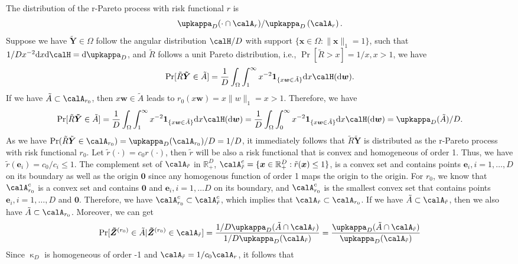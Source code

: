 \documentclass[12pt]{article}
\begin{document}
    The distribution of the r-Pareto process with risk functional $r$ is 
    $$\upkappa_D(\cdot\cap \calA_r )/\upkappa_D\left(\calA_r\right).$$ 
    Suppose we have $\bm{\tilde Y}\in\Omega$ follow the angular distribution $\calH/D$ with support $\{\bm x \in \Omega: \|\bm x\|_1 = 1\}$, such that $1/D x^{-2}\text dx\text d\calH = \text d\upkappa_D$,  and $\tilde R$ follows a unit Pareto distribution, i.e., $\Pr[\tilde R>x]=1/x, x>1$, we have
    $$\Pr[\tilde R\bm{\tilde Y}\in \tilde A] = \frac{1}{D}\int_{\Omega}\int_{1}^{\infty} x^{-2}\bm 1_{\{x\bm w\in \tilde A\}}\text dx\calH(\text d\bm w).$$
    If we have $\tilde A\subset\calA_{r_0}$, then $x\bm w\in\tilde A$ leads to $r_0(x\bm w)=x\|w\|_1=x >1$. Therefore, we have 
    $$\Pr[\tilde R\bm{\tilde Y}\in \tilde A] = \frac{1}{D}\int_{\Omega}\int_{1}^{\infty} x^{-2}\bm 1_{\{x\bm w\in \tilde A\}}\text dx\calH(\text d\bm w) = \frac{1}{D}\int_{\Omega}\int_{0}^{\infty} x^{-2}\bm 1_{\{x\bm w\in \tilde A\}}\text dx\calH(\text d\bm w) = \upkappa_D(\tilde A)/D.$$ 
    As we have $\Pr( \tilde R\tilde {\bm Y} \in \calA_{r_0}) = \upkappa_D(\calA_{r_0})/D=1/D$, it immediately follows that $\tilde R\bm {\tilde Y}$ is distributed as the r-Pareto process with risk functional $r_0$. Let $\tilde r(\cdot) = c_0 r(\cdot)$, then $\tilde r$ will be also a risk functional that is convex and homogeneous of order 1. Thus, we have $\tilde r(\bm e_i)=c_0/c_i\leq 1$. The complement set of $\calA_{\tilde r}$ in $\mathbb R_+^D$, $\calA_{\tilde r}^c=\{\bm x\in\mathbb R_+^D: \tilde r(\bm x)\leq 1\}$, is a convex set and contains points $\bm e_i, i=1,\dots,D$ on its boundary as well as the origin $\bm 0$ since any homogenous function of order 1 maps the origin to the origin. For $r_0$, we know that $\calA_{r_0}^c$ is a convex set and contains $\bm 0$ and $\bm e_i,i=1,\dots D$ on its boundary, and $\calA_{r_0}^c$ is the smallest convex set that contains points $\bm e_i,i=1,\dots,D$ and $\bm 0$. Therefore, we have $\calA_{r_0}^c\subset \calA_{\tilde r}^c$, which implies that $\calA_{\tilde r} \subset \calA_{r_0}$. If we have $\tilde A\subset\calA_{\tilde r}$, then we also have  $\tilde A\subset\calA_{r_0}$. Moreover, we can get
    \begin{equation}
        \Pr[\bm{\tilde Z}^{(r_0)}\in \tilde A | \bm{\tilde Z}^{(r_0)} \in \calA_{\tilde r} ] = \frac{1/D\upkappa_D(\tilde A\cap \calA_{\tilde r})}{1/D\upkappa_D(\calA_{\tilde r})} = \frac{\upkappa_D(\tilde A \cap \calA_{\tilde r})}{\upkappa_D(\calA_{\tilde r})}
    \end{equation}
    Since $\upkappa_D$ is homogeneous of order -1 and $\calA_{\tilde r} =  1/c_0\calA_r$, it follows that
\end{document}
